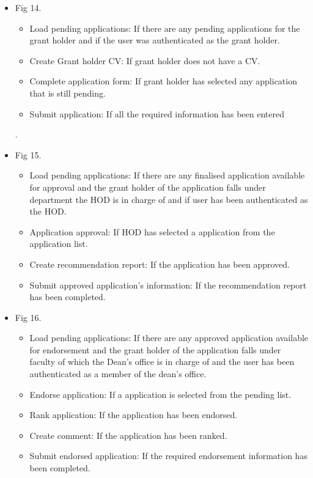 \documentclass[12pt]{article}
\begin{document}
\begin{itemize}
	\item Fig 14.
		\begin{itemize}
			\item Load pending applications: If there are any pending applications for the grant holder and if the user was authenticated as the grant holder.
			\item Create Grant holder CV: If grant holder does not have a CV.
			\item Complete application form: If grant holder has selected any application that is still pending.
			\item Submit application: If all the required information has been entered									
		\end{itemize}
		.	
	\item Fig 15.
		\begin{itemize}
			\item Load pending applications: If there are any finalised application available for approval and the grant holder of the application falls under department the HOD is in charge of and if user has been authenticated as the HOD.
			\item Application approval: If HOD has selected a application from the application list. 
			\item Create recommendation report: If the application has been approved.				
			\item Submit approved application's information: If the recommendation report has been completed.									
		\end{itemize}
		
	\item Fig 16.
		\begin{itemize}
			\item Load pending applications: If there are any approved application available for endorsement and the grant holder of the application falls under faculty of which the Dean's office is in charge of and the user has been authenticated as a member of the dean's office.
			\item Endorse application: If a application is selected from the pending list. 
			\item Rank application: If the application has been endorsed.	
			\item Create comment: If the application has been ranked.			
			\item Submit endorsed application: If the required endorsement information has been completed.									
		\end{itemize}
	

\end{itemize}
\end{document}
